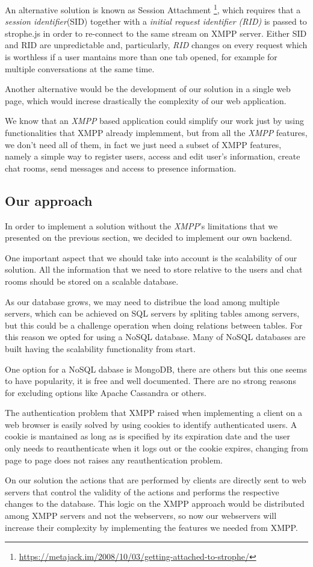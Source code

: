 An alternative solution is known as Session Attachment \footnote{\url{https://metajack.im/2008/10/03/getting-attached-to-strophe/}}, which requires that a \textit{session identifier}(SID) together with a \textit{initial request identifier (RID)} is passed to strophe.js in order to re-connect to the same stream on XMPP server. Either SID and RID are unpredictable and, particularly, \textit{RID} changes on every request which is worthless if a user mantains more than one tab opened, for example for multiple conversations at the same time.

Another alternative would be the development of our solution in a single web page, which would increse drastically the complexity of our web application.

We know that an \textit{XMPP} based application could simplify our work just by using functionalities that XMPP already implemment, but from all the \textit{XMPP} features, we don't need all of them, in fact we just need a subset of XMPP features, namely a simple way to register users, access and edit user's information, create chat rooms, send messages and access to presence information.

\subsection{Our approach}

In order to implement a solution without the \textit{XMPP}'s limitations that we presented on the previous section, we decided to implement our own backend. 

One important aspect that we should take into account is the scalability of our solution. All the information that we need to store relative to the users and chat rooms should be stored on a scalable database. 

As our database grows, we may need to distribue the load among multiple servers, which can be achieved on SQL servers by spliting tables among servers, but this could be a challenge operation when doing relations between tables. For this reason we opted for using a NoSQL database. Many of NoSQL databases are built having the scalability functionality from start.

One option for a NoSQL dabase is MongoDB, there are others but this one seems to have popularity, it is free and well documented. There are no strong reasons for excluding options like Apache Cassandra or others.

The authentication problem that XMPP raised when implementing a client on a web browser is easily solved by using cookies to identify authenticated users. A cookie is mantained as long as is specified by its expiration date and the user only needs to reauthenticate when it logs out or the cookie expires, changing from page to page does not raises any reauthentication problem.

On our solution the actions that are performed by clients are directly sent to web servers that control the validity of the actions and performs the respective changes to the database. This logic on the XMPP approach would be distributed among XMPP servers and not the webservers, so now our webservers will increase their complexity by implementing the features we needed from XMPP.

